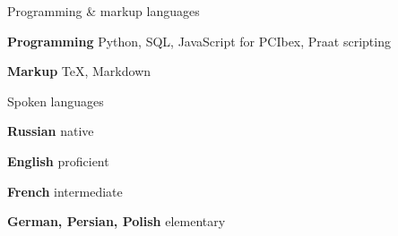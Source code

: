 

\begin{cventries}

   \cventry
    {Programming \& markup languages} %
    {} %
    {} %
    {} %
    {
      \begin{cvitems} %
        \item {\textbf{Programming} Python, SQL, JavaScript for PCIbex, Praat scripting}
        \item {\textbf{Markup} TeX, Markdown}
      \end{cvitems}
    }

 \cventry
    {Spoken languages} %
    {} %
    {} %
    {} %
    {
      \begin{cvitems} %
        \item {\textbf{Russian} native}
        \item {\textbf{English} proficient}
        \item {\textbf{French} intermediate}
        \item {\textbf{German, Persian, Polish} elementary}
      \end{cvitems}
    }

\end{cventries}
